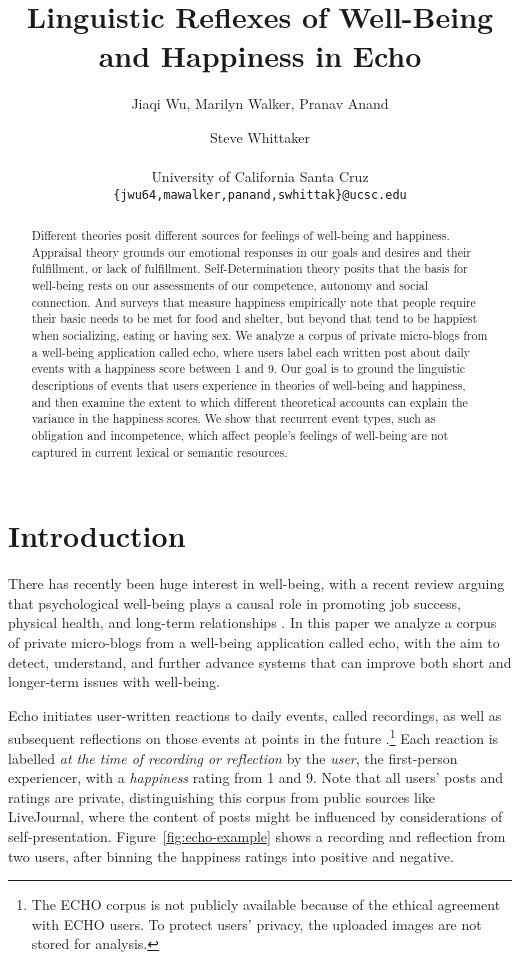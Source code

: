 \documentclass[11pt,letterpaper]{article}
\title{Linguistic Reflexes of Well-Being and Happiness in Echo}
\author{Jiaqi Wu, Marilyn Walker, Pranav Anand \and Steve Whittaker \\
         \\
 University of California Santa Cruz \\
  {\tt \{jwu64,mawalker,panand,swhittak\}@ucsc.edu}}
\begin{document}
\maketitle


\begin{abstract}
Different theories posit different sources for feelings of well-being
and happiness.  Appraisal theory grounds our emotional responses in
our goals and desires and their fulfillment, or lack of fulfillment.
Self-Determination theory posits that the basis for well-being rests
on our assessments of our competence, autonomy and social
connection. And surveys that measure happiness empirically note that
people require their basic needs to be met for food and shelter, but
beyond that tend to be happiest when socializing, eating or having
sex. We analyze a corpus of private micro-blogs from a well-being
application called {\sc echo}, where users label each written post
about daily events with a happiness score between 1 and 9.  Our goal
is to ground the linguistic descriptions of events that users
experience in theories of well-being and happiness, and then examine
the extent to which different theoretical accounts can explain the
variance in the happiness scores.  We show that
recurrent event types, such as {\sc obligation} and {\sc
  incompetence}, which affect people's feelings of well-being are not
captured in current lexical or semantic resources.


\end{abstract}

\section{Introduction}

There has recently been huge interest in well-being, with a recent
review arguing that psychological well-being plays a causal role in
promoting job success, physical health, and long-term relationships
\cite{Lyubomirskyetal05,Kahneman99}. In this paper we analyze a
corpus of private micro-blogs from a well-being application 
called {\sc echo},  with the aim to 
detect, understand, and further advance systems that can 
improve both short and longer-term issues with well-being.

{\sc Echo} initiates user-written reactions to daily events, called
{\sc recordings}, as well as subsequent {\sc reflections} on those
events at points in the future \cite{Isaacsetal13}.\footnote{The ECHO
  corpus is not publicly available because of the ethical agreement
  with ECHO users.  To protect users' privacy, the uploaded images 
 are not stored for analysis.} Each reaction is labelled {\it
    at the time of recording or reflection} by the {\it user}, the
  first-person experiencer, with a {\it happiness} rating from 1 and
  9. Note that all users' posts and ratings are private,
  distinguishing this corpus from public sources like LiveJournal,
  where the content of posts might be influenced by considerations of
  self-presentation. Figure~\ref{fig:echo-example} shows a {\sc
    recording} and {\sc reflection} from two users, after binning the
  happiness ratings into positive and negative.
\end{document}
